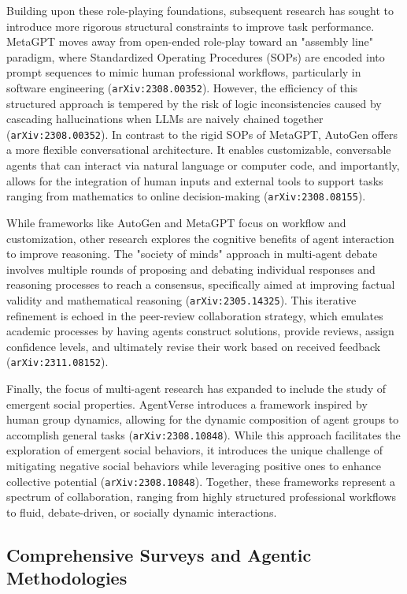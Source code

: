 \documentclass[11pt]{article}
\begin{document}
Building upon these role-playing foundations, subsequent research has sought to introduce more rigorous structural constraints to improve task performance. MetaGPT moves away from open-ended role-play toward an "assembly line" paradigm, where Standardized Operating Procedures (SOPs) are encoded into prompt sequences to mimic human professional workflows, particularly in software engineering (\texttt{arXiv:2308.00352}). However, the efficiency of this structured approach is tempered by the risk of logic inconsistencies caused by cascading hallucinations when LLMs are naively chained together (\texttt{arXiv:2308.00352}). In contrast to the rigid SOPs of MetaGPT, AutoGen offers a more flexible conversational architecture. It enables customizable, conversable agents that can interact via natural language or computer code, and importantly, allows for the integration of human inputs and external tools to support tasks ranging from mathematics to online decision-making (\texttt{arXiv:2308.08155}).

While frameworks like AutoGen and MetaGPT focus on workflow and customization, other research explores the cognitive benefits of agent interaction to improve reasoning. The "society of minds" approach in multi-agent debate involves multiple rounds of proposing and debating individual responses and reasoning processes to reach a consensus, specifically aimed at improving factual validity and mathematical reasoning (\texttt{arXiv:2305.14325}). This iterative refinement is echoed in the peer-review collaboration strategy, which emulates academic processes by having agents construct solutions, provide reviews, assign confidence levels, and ultimately revise their work based on received feedback (\texttt{arXiv:2311.08152}).

Finally, the focus of multi-agent research has expanded to include the study of emergent social properties. AgentVerse introduces a framework inspired by human group dynamics, allowing for the dynamic composition of agent groups to accomplish general tasks (\texttt{arXiv:2308.10848}). While this approach facilitates the exploration of emergent social behaviors, it introduces the unique challenge of mitigating negative social behaviors while leveraging positive ones to enhance collective potential (\texttt{arXiv:2308.10848}). Together, these frameworks represent a spectrum of collaboration, ranging from highly structured professional workflows to fluid, debate-driven, or socially dynamic interactions.

\subsection{Comprehensive Surveys and Agentic Methodologies}
\end{document}
